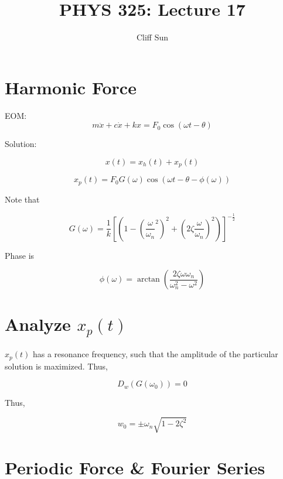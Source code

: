 \documentclass{article}
\title{PHYS 325: Lecture 17}
\author{Cliff Sun}
\newtheorem{one minute paper}[theorem]{One Minute Paper}
\begin{document}
\maketitle

\section*{Harmonic Force}

EOM:
\begin{equation}
    m\ddot{x} + c\dot{x} + kx = F_0\cos(\omega t - \theta)
\end{equation}

Solution:

\begin{equation}
    x(t) = x_h(t) + x_p(t)
\end{equation}

\begin{equation}
    x_p(t) = F_0G(\omega)\cos(\omega t - \theta - \phi(\omega))
\end{equation}

Note that 

\begin{equation}
    G(\omega) = \frac{1}{k}\left[(1-(\frac{\omega}{\omega_n}^2)^2 + (2\zeta\frac{\omega}{\omega_n})^2)\right]^{-\frac{1}{2}}
\end{equation}

Phase is 

\begin{equation}
    \phi(\omega) = \arctan(\frac{2\zeta\omega\omega_n}{\omega_n^2 - \omega^2})
\end{equation}

\section*{Analyze $x_p(t)$}

$x_p(t)$ has a resonance frequency, such that the amplitude of the particular solution is maximized. Thus, 

\begin{equation}
    D_w (G(\omega_0)) = 0
\end{equation}

Thus, 

\begin{equation}
    w_0 = \pm\omega_n \sqrt{1 - 2\zeta^2}
\end{equation}

\section*{Periodic Force \& Fourier Series}
\end{document}
